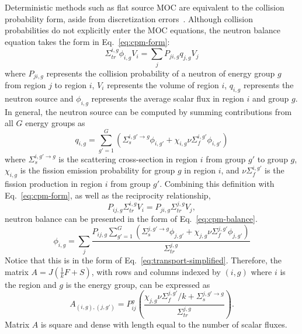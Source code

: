 Deterministic methods such as flat source \ac{MOC} are equivalent to the collision probability form, aside from discretization errors~\cite{ty-problem}. Although collision probabilities do not explicitly enter the \ac{MOC} equations, the neutron balance equation takes the form in Eq.~\ref{eq:cpm-form}:
\begin{equation}
	\Sigma_{\textit{tr}}^{i, g} \phi_{i,g} V_i = \sum_j P_{ji, g} q_{j,g} V_j
	\label{eq:cpm-form}
\end{equation}
where $P_{ji,g}$ represents the collision probability of a neutron of energy group $g$ from region $j$ to region $i$, $V_i$ represents the volume of region $i$, $q_{i,g}$ represents the neutron source and $\phi_{i,g}$ represents the average scalar flux in region $i$ and group $g$. In general, the neutron source can be computed by summing contributions from all $G$ energy groups as
\begin{equation}
	q_{i,g} = \sum_{g'=1}^G \left( \Sigma_{s}^{i,g'\rightarrow g} \phi_{i,g'} + \chi_{i,g} \nu \Sigma_{f}^{i,g'} \phi_{i,g'} \right)
\end{equation}
where $\Sigma_{s}^{i, g'\rightarrow g}$ is the scattering cross-section in region $i$ from group $g'$ to group $g$, $\chi_{i,g}$ is the fission emission probability for group $g$ in region $i$, and $\nu \Sigma_{f}^{i,g'}$ is the fission production in region $i$ from group $g'$. Combining this definition with Eq.~\ref{eq:cpm-form}, as well as the reciprocity relationship, 
\begin{equation}
	P_{ij, g} \Sigma_{\textit{tr}}^{i, g} V_i = P_{ji, g} \Sigma_{\textit{tr}}^{j, g} V_j,
	\label{eq:reciprocity}
\end{equation}
neutron balance can be presented in the form of Eq.~\ref{eq:cpm-balance}.
\begin{equation}
	\phi_{i,g} = \sum_j \frac{P_{ij, g} \sum_{g'=1}^G \left( \Sigma_{s}^{j, g'\rightarrow g} \phi_{j,g'} + \chi_{j,g} \nu \Sigma_{f}^{j,g'} \phi_{j,g'} \right)}{\Sigma_{\textit{tr}}^{j, g}} 
	\label{eq:cpm-balance}
\end{equation}
Notice that this is in the form of Eq.~\ref{eq:transport-simplified}. Therefore, the matrix $A = J\left(\frac{1}{k}F + S\right)$, with rows and columns indexed by $(i, g)$  where $i$ is the region and $g$ is the energy group, can be expressed as
\begin{equation}
	A_{(i,g), (j, g')} = P_{ij}^g \left(\frac{\chi_{j,g} \nu\Sigma_{f}^{j,g'} / k + \Sigma_{s}^{j,g' \rightarrow g}}{\Sigma_{\textit{tr}}^{j, g}}\right).
	\label{eq:a-matrix}
\end{equation}
Matrix $A$ is square and dense with length equal to the number of scalar fluxes. 


